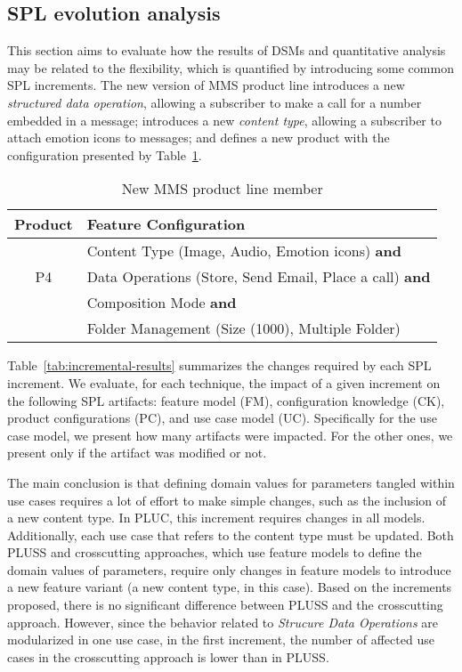 \documentclass{acm_proc_article-sp}
\begin{document}
\subsection{SPL evolution analysis}
\label{evolution-analysis}

This section aims to evaluate how the results of DSMs and quantitative analysis may be related 
to the flexibility, which is quantified by introducing some common SPL increments. The new version of MMS 
product line introduces a new \emph{structured data operation}, allowing a subscriber to make 
a call for a number embedded in a message;  introduces a new \emph{content type}, allowing a subscriber 
to attach emotion icons to messages; and defines a new product with the configuration presented by Table~\ref{tab:new-product}.

\begin{table}[hb]
\centering
\caption{New MMS product line member}
\label{tab:new-product}
\begin{small}
\begin{tabular}{|c|l|} \hline
Product & Feature Configuration \\ \hline
      & Content Type (Image, Audio, Emotion icons) {\bf and} \\ 
 P4 & Data Operations (Store, Send Email, Place a call) {\bf and}\\
      & Composition Mode {\bf and} \\
      & Folder Management (Size (1000), Multiple Folder)  \\ \hline 
\end{tabular}
\end{small}
\end{table}

Table~\ref{tab:incremental-results} summarizes the changes required by each SPL increment. We evaluate, for each technique, 
the impact of a given increment on  the following SPL artifacts: feature model (FM), configuration knowledge (CK), product configurations (PC), and use case model (UC). Specifically for the use case model, we present how many artifacts were impacted. For the other ones, we present only if the artifact was modified or not. 

The main conclusion is that defining domain values for parameters tangled within use cases requires a lot of effort to make simple 
changes, such as the inclusion of a new content type. In PLUC, this increment requires changes in all models. Additionally, each use 
case that refers to the content type must be updated.  Both PLUSS and crosscutting approaches, which use feature models to define 
the domain values of parameters, require only changes in feature models to introduce a new feature variant (a new content type, in 
this case). Based on the increments proposed, there is no significant difference between PLUSS and the crosscutting approach. However, since the behavior related to \emph{Strucure Data Operations} are modularized in one use case, in the
first increment, the number of affected use cases in the crosscutting approach is lower than in PLUSS. 
\end{document}
